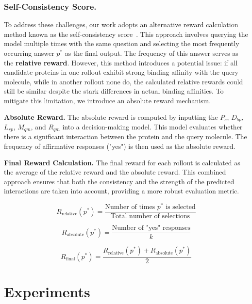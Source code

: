 \documentclass[letterpaper,twocolumn,10pt]{llncs}
\begin{document}
\subsubsection{Self-Consistency Score.}
To address these challenges, our work adopts an alternative reward calculation method known as the self-consistency score~\cite{wang2022self}. This approach involves querying the model multiple times with the same question and selecting the most frequently occurring answer $p^*$ as the final output. The frequency of this answer serves as the \textbf{relative reward}. 
However, this method introduces a potential issue: if all candidate proteins in one rollout exhibit strong binding affinity with the query molecule, while in another rollout none do, the calculated relative rewards could still be similar despite the stark differences in actual binding affinities. To mitigate this limitation, we introduce an absolute reward mechanism.

\textbf{Absolute Reward.}
The absolute reward is computed by inputting the $P_{s}$, $D_{bp}$, $L_{rp}$, $M_{qm}$, and $R_{qm}$ into a decision-making model. This model evaluates whether there is a significant interaction between the protein and the query molecule. The frequency of affirmative responses ("yes") is then used as the absolute reward.

\textbf{Final Reward Calculation.}
The final reward for each rollout is calculated as the average of the relative reward and the absolute reward. This combined approach ensures that both the consistency and the strength of the predicted interactions are taken into account, providing a more robust evaluation metric.

\begin{equation}
R_{\text{relative}}(p^*) = \frac{\text{Number of times } p^* \text{ is selected}}{\text{Total number of selections}}
\end{equation}

\begin{equation}
R_{\text{absolute}}(p^*) = \frac{\text{Number of "yes" responses}}{k}
\end{equation}

\begin{equation}
R_{\text{final}}(p^*) = \frac{R_{\text{relative}}(p^*) + R_{\text{absolute}}(p^*)}{2}
\end{equation}



\section{Experiments}
\end{document}
